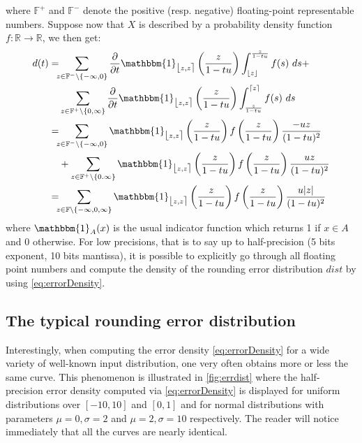 \documentclass[10pt,conference]{IEEEtran}
\newcommand{\ceil}[1]{\lceil #1 \rceil}
\newcommand{\floor}[1]{\lfloor #1 \rfloor}
\newcommand{\fintvl}[1][x]{\mathlarger{\lfloor}#1,#1\mathlarger{\rceil}}
\newcommand{\F}{\mathbb{F}}
\newcommand{\R}{\mathbb{R}}
\newcommand{\one}{\mathbbm{1}}
\newcommand{\absv}[1]{\vert #1\vert}
\newcommand{\dt}{\frac{\partial}{\partial t}}
\begin{document}
where $\F^+$ and $\F^-$ denote the positive (resp. negative) floating-point representable numbers.
Suppose now that $X$ is described by a probability density function $f:\R\to\R$, we then get:
\begin{align}
d(t)
=&\hspace{-1ex}\sum_{z\in\F^-\setminus\{-\infty,0\}}\dt\one_{\fintvl[z]}\left(\frac{z}{1-tu}\right) \int^{\frac{z}{1-tu}}_{\floor{z}} f(s)~ds+\nonumber 
\\
&\sum_{z\in\F^+\setminus\{0,\infty\}}\dt\one_{\fintvl[z]}\left(\frac{z}{1-tu}\right) \int^{\ceil{z}}_{\frac{z}{1-tu}} f(s)~ds\nonumber 
\\
=&\hspace{-1ex}\sum_{z\in\F^-\setminus\{-\infty,0\}}\one_{\fintvl[z]}\left(\frac{z}{1-tu}\right) f\left(\frac{z}{1-tu}\right) \frac{-uz}{(1-tu)^2}\nonumber
\\
& +\sum_{z\in\F^+\setminus\{0.\infty\}}\one_{\fintvl[z]}\left(\frac{z}{1-tu}\right) f\left(\frac{z}{1-tu}\right) \frac{uz}{(1-tu)^2}\nonumber 
\\
=&\hspace{-1ex}\sum_{z\in\F\setminus\{-\infty,0,\infty\}}\one_{\fintvl[z]}\left(\frac{z}{1-tu}\right) f\left(\frac{z}{1-tu}\right) \frac{u\absv{z}}{(1-tu)^2}\label{eq:errorDensity}
\end{align}
where $\one_{A}(x)$ is the usual indicator function which returns 1 if $x\in A$ and 0 otherwise. For low precisions, that is to say up to half-precision (5 bits exponent, 10 bits mantissa), it is possible to explicitly go through all floating point numbers and compute the density of the rounding error distribution $dist$ by using \cref{eq:errorDensity}. 

\subsection{The typical rounding error distribution}
Interestingly, when computing the error density \cref{eq:errorDensity} for a wide variety of well-known input distribution, one very often obtains more or less the same curve. This phenomenon is illustrated in \cref{fig:errdist} where the half-precision error density computed via \cref{eq:errorDensity} is displayed for uniform distributions over $\left[-10,10\right]$ and $\left[0,1\right]$ and for normal distributions with parameters $\mu=0,\sigma=2$ and $\mu=2,\sigma=10$ respectively. The reader will notice immediately that all the curves are nearly identical.
\end{document}
